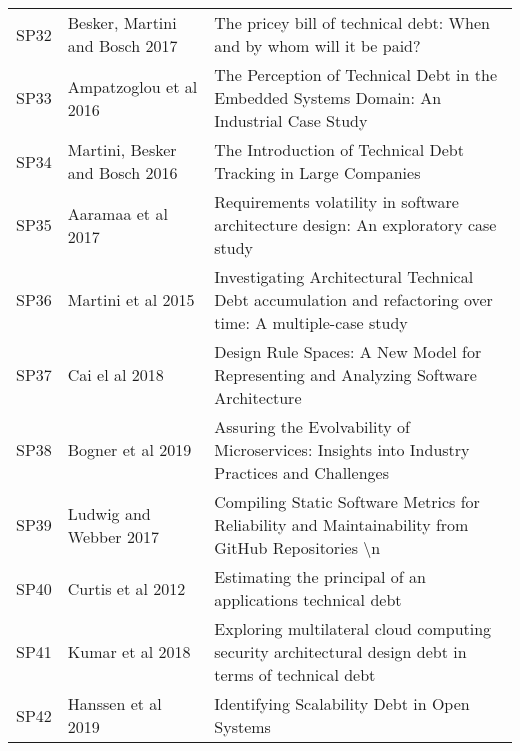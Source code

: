 \begin{tabular}{lll}
 SP32 &  Besker, Martini and Bosch 2017 &                                                                                                       The pricey bill of technical debt: When and by whom will it be paid? \\
 SP33 &          Ampatzoglou et al 2016 &                                                                                The Perception of Technical Debt in the Embedded Systems Domain: An Industrial Case Study   \\
 SP34 &  Martini, Besker and Bosch 2016 &                                                                                                             The Introduction of Technical Debt Tracking in Large Companies \\
 SP35 &              Aaramaa et al 2017 &                                                                                         Requirements volatility in software architecture design: An exploratory case study \\
 SP36 &              Martini et al 2015 &                                                                  Investigating Architectural Technical Debt accumulation and refactoring over time: A multiple-case study  \\
 SP37 &                  Cai el al 2018 &                                                                                       Design Rule Spaces: A New Model for Representing and Analyzing Software Architecture \\
 SP38 &               Bogner et al 2019 &                                                                              Assuring the Evolvability of Microservices: Insights into Industry Practices and Challenges   \\
 SP39 &          Ludwig and Webber 2017 &                                                                          Compiling Static Software Metrics for Reliability and Maintainability from GitHub Repositories \textbackslash n \\
 SP40 &               Curtis et al 2012 &                                                                                                                 Estimating the principal of an applications technical debt \\
 SP41 &                Kumar et al 2018 &                                                                     Exploring multilateral cloud computing security architectural design debt in terms of technical debt   \\
 SP42 &              Hanssen et al 2019 &                                                                                                                               Identifying Scalability Debt in Open Systems \\

\end{tabular}
